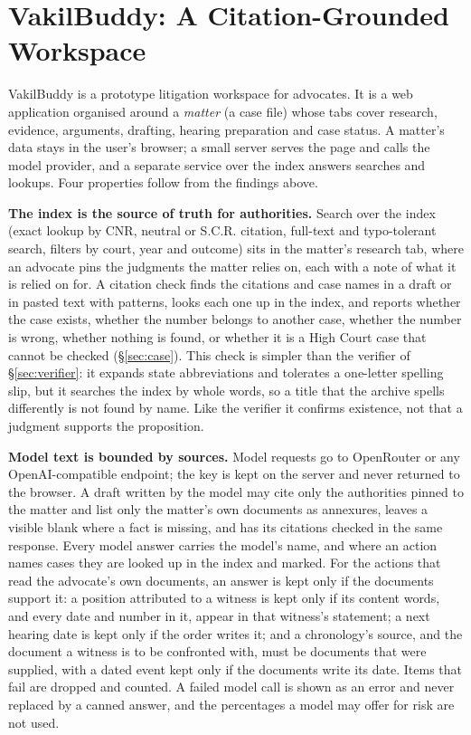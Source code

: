 \section{VakilBuddy: A Citation-Grounded Workspace}
\label{sec:system}
VakilBuddy is a prototype litigation workspace for advocates. It is a web application organised around a \emph{matter} (a case file) whose tabs cover research, evidence, arguments, drafting, hearing preparation and case status. A matter's data stays in the user's browser; a small server serves the page and calls the model provider, and a separate service over the index answers searches and lookups. Four properties follow from the findings above.

\textbf{The index is the source of truth for authorities.} Search over the index (exact lookup by CNR, neutral or S.C.R. citation, full-text and typo-tolerant search, filters by court, year and outcome) sits in the matter's research tab, where an advocate pins the judgments the matter relies on, each with a note of what it is relied on for. A citation check finds the citations and case names in a draft or in pasted text with patterns, looks each one up in the index, and reports whether the case exists, whether the number belongs to another case, whether the number is wrong, whether nothing is found, or whether it is a High Court case that cannot be checked (\S\ref{sec:case}). This check is simpler than the verifier of \S\ref{sec:verifier}: it expands state abbreviations and tolerates a one-letter spelling slip, but it searches the index by whole words, so a title that the archive spells differently is not found by name. Like the verifier it confirms existence, not that a judgment supports the proposition.

\textbf{Model text is bounded by sources.} Model requests go to OpenRouter \cite{openrouter} or any OpenAI-compatible endpoint; the key is kept on the server and never returned to the browser. A draft written by the model may cite only the authorities pinned to the matter and list only the matter's own documents as annexures, leaves a visible blank where a fact is missing, and has its citations checked in the same response. Every model answer carries the model's name, and where an action names cases they are looked up in the index and marked. For the actions that read the advocate's own documents, an answer is kept only if the documents support it: a position attributed to a witness is kept only if its content words, and every date and number in it, appear in that witness's statement; a next hearing date is kept only if the order writes it; and a chronology's source, and the document a witness is to be confronted with, must be documents that were supplied, with a dated event kept only if the documents write its date. Items that fail are dropped and counted. A failed model call is shown as an error and never replaced by a canned answer, and the percentages a model may offer for risk are not used.

